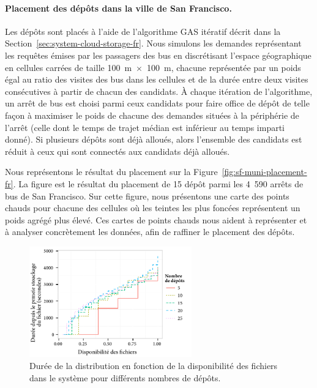  
\paragraph{Placement des dépôts dans la ville de San Francisco.} 
Les dépôts sont placés à l’aide de l’algorithme GAS itératif décrit dans la Section~\ref{sec:system-cloud-storage-fr}. Nous simulons les demandes représentant les requêtes émises par les passagers des bus en discrétisant l’espace géographique en cellules carrées de taille 100~m~$\times$~100~m, chacune représentée par un poids égal au ratio des visites des bus dans les cellules et de la durée entre deux visites consécutives à partir de chacun des candidats. À chaque itération de l’algorithme, un arrêt de bus est choisi parmi ceux candidats pour faire office de dépôt de telle façon à maximiser le poids de chacune des demandes situées à la périphérie de l’arrêt (\ie celle dont le temps de trajet médian est inférieur au temps imparti donné). Si plusieurs dépôts sont déjà alloués, alors l’ensemble des candidats est réduit à ceux qui sont connectés aux candidats déjà alloués.  
 
Nous représentons le résultat du placement sur la Figure~\ref{fig:sf-muni-placement-fr}. La figure est le résultat du placement de 15 dépôt parmi les 4~590 arrêts de bus de San Francisco. Sur cette figure, nous présentons une carte des points chauds pour chacune des cellules où les teintes les plus foncées représentent un poids agrégé plus élevé. Ces cartes de points chauds nous aident à représenter et à analyser concrètement les données, afin de raffiner le placement des dépôts.  
 
 \begin{figure} 
    \centering 
    \includegraphics[width=7cm]{figures-fr/propagationTimes-fr.pdf} 
    \caption{Durée de la distribution en fonction de la disponibilité des fichiers dans le système pour différents nombres de dépôts.} 
    \label{fig:propagationTimes-fr} 
\end{figure} 
